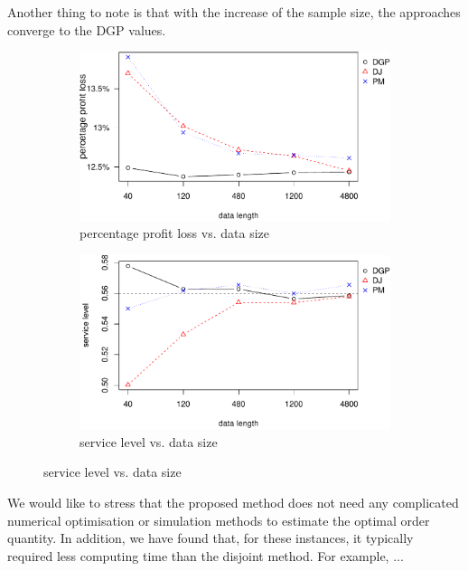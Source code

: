 \documentclass{article}
\begin{document}
Another thing to note is that with the increase of the sample size, the approaches converge to the DGP values.

\begin{figure}
\centering
\caption{Performance vs. data size with nonlinear profit function}
\begin{subfigure}[b]{0.48\textwidth}
\centering
\includegraphics[width=\textwidth]{nonlinear-plot_files/figure-latex/ppl-1.pdf}
\caption{percentage profit loss vs. data size}
\end{subfigure}
\hfill
\begin{subfigure}[b]{0.48\textwidth}
\centering
\includegraphics[width=\textwidth]{nonlinear-plot_files/figure-latex/sl-1.pdf}
\caption{service level vs. data size}
\end{subfigure}
\label{fig:non}
\end{figure}

We would like to stress that the proposed method does not need any complicated numerical optimisation or simulation methods to estimate the optimal order quantity. In addition, we have found that, for these instances, it typically required less computing time than the disjoint method. For example, ...
 
\end{document}
